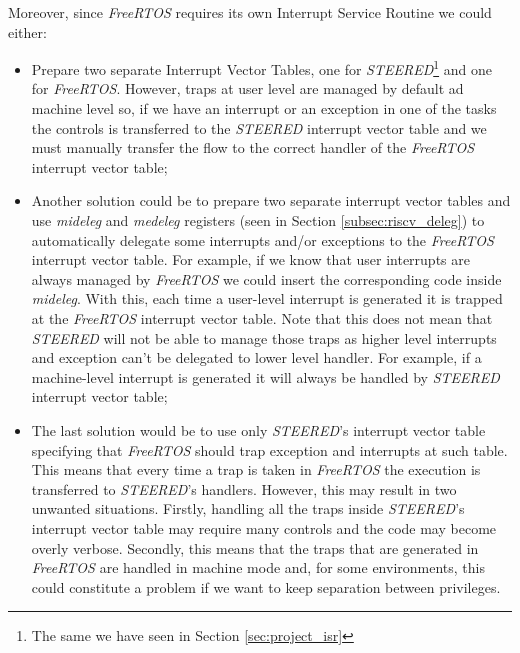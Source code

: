 Moreover, since \textit{FreeRTOS} requires its own Interrupt Service Routine we
could either:
\begin{itemize}
  \item Prepare two separate Interrupt Vector Tables, one for \textit{STEERED}\footnote{The
    same we have seen in Section \ref{sec:project_isr}} and one for \textit{FreeRTOS}.
    However, traps at user level are managed by default ad machine level so, if
    we have an interrupt or an exception in one of the tasks the controls is
    transferred to the \textit{STEERED} interrupt vector table and we must manually
    transfer the flow to the correct handler of the \textit{FreeRTOS} interrupt
    vector table;

  \item Another solution could be to prepare two separate interrupt vector tables
    and use \textit{mideleg} and \textit{medeleg} registers (seen in Section
    \ref{subsec:riscv_deleg}) to automatically delegate some interrupts and/or exceptions
    to the \textit{FreeRTOS} interrupt vector table. For example, if we know
    that user interrupts are always managed by \textit{FreeRTOS} we could insert
    the corresponding code inside \textit{mideleg}. With this, each time a user-level
    interrupt is generated it is trapped at the \textit{FreeRTOS} interrupt vector
    table. Note that this does not mean that \textit{STEERED} will not be able to
    manage those traps as higher level interrupts and exception can't be delegated
    to lower level handler. For example, if a machine-level interrupt is generated
    it will always be handled by \textit{STEERED} interrupt vector table;

  \item The last solution would be to use only \textit{STEERED}'s interrupt
    vector table specifying that \textit{FreeRTOS} should trap exception and interrupts
    at such table. This means that every time a trap is taken in \textit{FreeRTOS}
    the execution is transferred to \textit{STEERED}'s handlers. However, this
    may result in two unwanted situations. Firstly, handling all the traps
    inside \textit{STEERED}'s interrupt vector table may require many controls and
    the code may become overly verbose. Secondly, this means that the traps that
    are generated in \textit{FreeRTOS} are handled in machine mode and, for some
    environments, this could constitute a problem if we want to keep separation
    between privileges.
\end{itemize}

